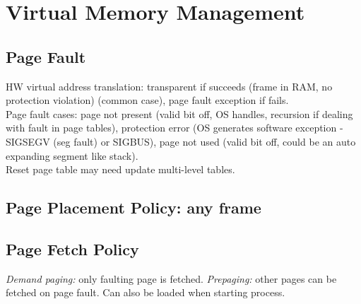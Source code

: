 \section{Virtual Memory Management}
\subsection*{Page Fault}
HW virtual address translation: transparent if succeeds (frame in RAM, no protection violation) (common case), page fault exception if fails.\\
Page fault cases: page not present (valid bit off, OS handles, recursion if dealing with fault in page tables), protection error (OS generates software exception - SIGSEGV (seg fault) or SIGBUS), page not used (valid bit off, could be an auto expanding segment like stack).\\
Reset page table may need update multi-level tables.

\subsection*{Page Placement Policy: any frame}
\subsection*{Page Fetch Policy}
\emph{Demand paging:} only faulting page is fetched. \emph{Prepaging:} other pages can be fetched on page fault. Can also be loaded when starting process.

